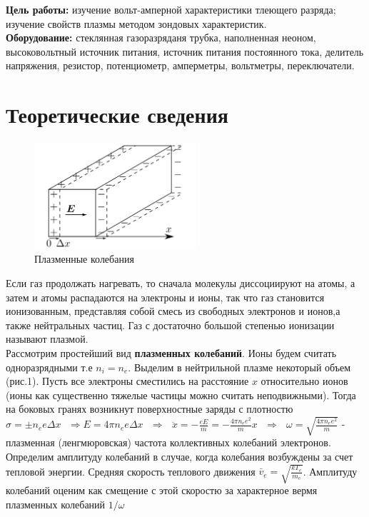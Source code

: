 \textbf{Цель работы:} изучение вольт-амперной характеристики тлеющего разряда; изучение свойств плазмы методом зондовых характеристик.\\\indent
\textbf{Оборудование:} стеклянная газоразряданя трубка, наполненная неоном, высоковольтный источник питания, источник питания постоянного тока, делитель напряжения, резистор, потенциометр, амперметры, вольтметры, переключатели.

\section*{Теоретические сведения}
\begin{figure}
    \centering
    \includegraphics[width=6cm]{images/flactuation.png}
    \caption{Плазменные колебания}
\end{figure}
Если газ продолжать нагревать, то сначала молекулы диссоциируют на атомы, а затем и
атомы распадаются на электроны и ионы, так что газ становится ионизованным, представляя собой смесь из свободных электронов и ионов,а также нейтральных частиц.
Газ с достаточно большой степенью ионизации называют плазмой.\\\indent
Рассмотрим простейший вид \textbf{плазменных колебаний}. Ионы будем считать одноразрядными т.е $n_i = n_e$. Выделим в нейтрильной плазме некоторый объем (рис.1). Пусть все электроны сместились на расстояние $x$ относительно ионов (ионы как существенно тяжелые частицы можно считать неподвижными). Тогда на боковых гранях возникнут поверхностные заряды с плотностю $\sigma = \pm n_e e \Delta x \text{  }\Rightarrow E = 4 \pi n_e e \Delta x \text{  }\Rightarrow \text{  } \ddot{x} = -\frac{eE}{m} = -\frac{4\pi n_e e^2}{m}x \text{  } \Rightarrow \text{  } \omega = \sqrt{\frac{4\pi n_e e^2}{m}}$ - плазменная (ленгмюровская) частота коллективных колебаний электронов.\\
\indent Определим амплитуду колебаний в случае, когда колебания возбуждены за счет тепловой энергии. Средняя скорость теплового движения $\bar v_e = \sqrt{\frac{kT_e}{m_e}}$. Амплитуду колебаний оценим как смещение с этой скоростю за характерное вермя плазменных колебаний $1 / \omega$ 
